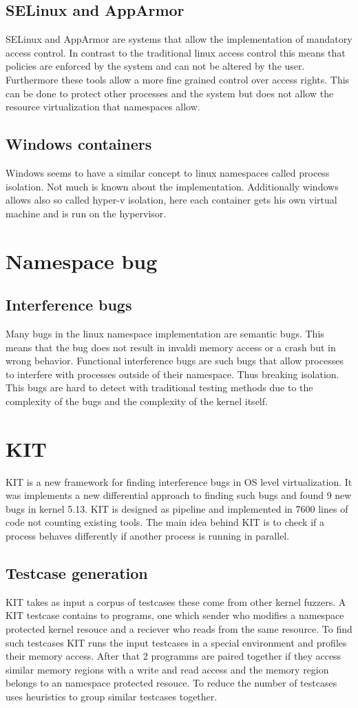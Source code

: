 \documentclass[10pt,twocolumn,a4paper]{article}
\begin{document}
\subsection{SELinux and AppArmor}
SELinux and AppArmor are systems that allow the implementation of mandatory access control. In
contrast to the traditional linux access control this means that policies are enforced by the system
and can not be altered by the user. Furthermore these tools allow a more fine grained control over
access rights. This can be done to protect other processes and the system but does not allow the resource
virtualization that namespaces allow\cite{26}\cite{27}. 
\subsection{Windows containers}
Windows seems to have a similar concept to linux namespaces called process isolation. Not much is known about the
implementation. Additionally windows allows also so called hyper-v isolation, here each container
gets his own virtual machine and is run on the hypervisor\cite{3}.
\section{Namespace bug}
\subsection{Interference bugs}
Many bugs in the linux namespace implementation are semantic bugs. This means that the 
bug does not result in invaldi memory access or a crash but in wrong behavior. Functional interference bugs are
such bugs that allow processes to interfere with processes outside of their namespace. Thus
breaking isolation. This bugs are hard to detect with traditional testing methods due to the
complexity of the bugs and the complexity of the kernel itself.
\section{KIT}
KIT is a new framework for finding interference bugs in OS level virtualization\cite{0}. It was
implements a new differential approach to finding such bugs and found 9 new bugs in kernel 5.13\cite{2}.
KIT is designed as pipeline and implemented in 7600 lines of code not counting existing tools\cite{0}.
The main idea behind KIT is to check if a process behaves differently if another process is running
in parallel.
\subsection{Testcase generation}
KIT takes as input a corpus of testcases these come from other kernel fuzzers.
A KIT testcase contains to programs, one which sender who modifies a namespace protected kernel
resouce and a reciever who reads from the same resource. To find such testcases
KIT runs the input testcases in a special environment and profiles their memory access. 
After that 2 programms are paired together if they access similar memory regions with a write and
read access and the memory region belongs to an namespace protected resouce.
To reduce the number of testcases uses heuristics to group similar testcases together.
\end{document}
